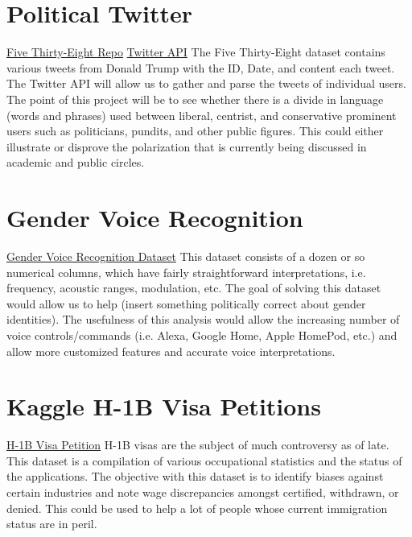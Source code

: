 \documentclass[letter]{article}
\begin{document}
\section{Political Twitter}
\href{https://www.kaggle.com/fivethirtyeight/fivethirtyeight}{Five Thirty-Eight Repo}
\newline
\href{https://dev.twitter.com/rest/public}{Twitter API}
\newline
The Five Thirty-Eight dataset contains various tweets from Donald Trump with the ID, Date, and content each tweet. The Twitter API will allow us to gather and parse the tweets of individual users. The point of this project will be to see whether there is a divide in language (words and phrases) used between liberal, centrist, and conservative prominent users such as politicians, pundits, and other public figures. This could either illustrate or disprove the polarization that is currently being discussed in academic and public circles. 

\section{Gender Voice Recognition}
\href{https://www.kaggle.com/primaryobjects/voicegender}{Gender Voice Recognition Dataset}
\newline
This dataset consists of a dozen or so numerical columns, which have fairly straightforward interpretations, i.e. frequency, acoustic ranges, modulation, etc. The goal of solving this dataset would allow us to help (insert something politically correct about gender identities). The usefulness of this analysis would allow the increasing number of voice controls/commands (i.e. Alexa, Google Home, Apple HomePod, etc.) and allow more customized features and accurate voice interpretations.

\section{Kaggle H-1B Visa Petitions}
\href{https://www.kaggle.com/nsharan/h-1b-visa}{H-1B Visa Petition}
\newline
H-1B visas are the subject of much controversy as of late. This dataset is a compilation of various occupational statistics and the status of the applications. The objective with this dataset is to identify biases against certain industries and note wage discrepancies amongst certified, withdrawn, or denied. This could be used to help a lot of people whose current immigration status are in peril.
\end{document}
